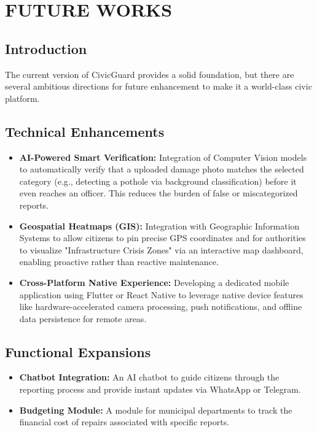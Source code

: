 \chapter{FUTURE WORKS}

\section{Introduction}
The current version of CivicGuard provides a solid foundation, but there are several ambitious directions for future enhancement to make it a world-class civic platform.

\section{Technical Enhancements}
\begin{itemize}
    \item \textbf{AI-Powered Smart Verification:} Integration of Computer Vision models to automatically verify that a uploaded damage photo matches the selected category (e.g., detecting a pothole via background classification) before it even reaches an officer. This reduces the burden of false or miscategorized reports.
    \item \textbf{Geospatial Heatmaps (GIS):} Integration with Geographic Information Systems to allow citizens to pin precise GPS coordinates and for authorities to visualize "Infrastructure Crisis Zones" via an interactive map dashboard, enabling proactive rather than reactive maintenance.
    \item \textbf{Cross-Platform Native Experience:} Developing a dedicated mobile application using Flutter or React Native to leverage native device features like hardware-accelerated camera processing, push notifications, and offline data persistence for remote areas.
\end{itemize}

\section{Functional Expansions}
\begin{itemize}
    \item \textbf{Chatbot Integration:} An AI chatbot to guide citizens through the reporting process and provide instant updates via WhatsApp or Telegram.
    \item \textbf{Budgeting Module:} A module for municipal departments to track the financial cost of repairs associated with specific reports.
\end{itemize}
